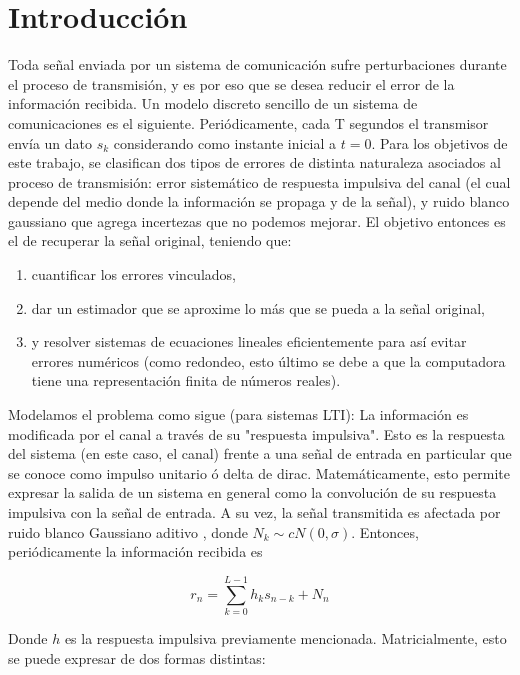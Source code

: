 \section{Introducci\'on}
Toda se\~nal enviada por un sistema de comunicaci\'on sufre perturbaciones durante el proceso de transmisi\'on, y es por eso que se desea reducir el error de la informaci\'on recibida.
Un modelo discreto sencillo de un sistema de comunicaciones es el siguiente. Peri\'odicamente, cada T segundos el transmisor env\'ia un dato $s_k$ considerando como instante inicial a $t = 0$. Para los objetivos de este trabajo, se clasifican dos tipos de errores de distinta naturaleza asociados al proceso de transmisi\'on: error sistemático de respuesta impulsiva del canal (el cual depende del medio donde la información se propaga y de la se\~nal), y ruido blanco gaussiano que agrega incertezas que no podemos mejorar. El objetivo entonces es el de recuperar la se\~nal original, teniendo que:
\begin{enumerate}
	\item cuantificar los errores vinculados,
	\item dar un estimador que se aproxime lo más que se pueda a la se\~nal original,
	\item y resolver sistemas de ecuaciones lineales eficientemente para as\'i evitar errores num\'ericos (como redondeo, esto \'ultimo se debe a que la computadora tiene una representaci\'on finita de n\'umeros reales).
\end{enumerate}

 Modelamos el problema como sigue (para sistemas LTI): La informaci\'on es modificada por el canal a través de su "respuesta impulsiva". Esto es la respuesta del sistema (en este caso, el canal) frente a una se\~nal de entrada en particular que se conoce como impulso unitario \'o delta de dirac. Matem\'aticamente, esto permite expresar la salida de un sistema en general como la convoluci\'on de su respuesta impulsiva con la se\~nal de entrada.
A su vez, la señal transmitida es afectada por ruido blanco Gaussiano aditivo , donde $N_k \sim cN(0,\sigma)$. Entonces, peri\'odicamente la informaci\'on recibida es 

\begin{equation*} 
r_n = \sum_{k=0}^{L-1} h_k s_{n-k} + N_n 
\end{equation*} 

Donde $h$  es la respuesta impulsiva previamente mencionada. Matricialmente, esto se puede expresar de dos formas distintas:

